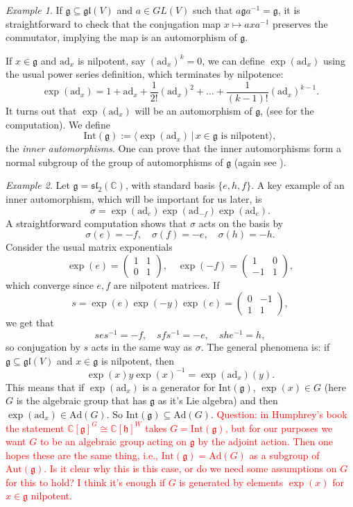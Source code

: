 \documentclass[12pt]{amsart}
\newcommand{\C}{\mathbb{C}}
\newcommand{\g}{\mathfrak{g}}
\newcommand{\h}{\mathfrak{h}}
\newcommand{\ad}{\mathrm{ad}}
\theoremstyle{remark}
\theoremstyle{remark}
\newtheorem*{example}{Example}
\theoremstyle{remark}
\begin{document}
\begin{example}
If $\g \subseteq \mathfrak{gl}(V)$ and $a \in GL(V)$ such that $a \g a^{-1} = \g$, it is straightforward to check that the conjugation map $x \mapsto a x a^{-1}$ preserves the commutator, implying the map is an automorphism of $\g$.
\end{example}

If $x \in \g$ and $\ad_x$ is nilpotent, say $(\ad_x)^k = 0$, we can define $\exp(\ad_x)$ using the usual power series definition, which terminates by nilpotence:
$$\exp(\ad_x) = 1 + \ad_x + \frac{1}{2!} (\ad_x)^2 + \ldots + \frac{1}{(k-1)!} (\ad_x)^{k-1}.$$
It turns out that $\exp(\ad_x)$ will be an automorphism of $\g$, (see \cite[\S 2.3]{Humphreys72} for the computation).
We define 
$$\mathrm{Int}(\g) := \langle \exp(\ad_x) \, | \, x \in \g \text{ is nilpotent}\rangle,$$
the \emph{inner automorphisms}.
One can prove that the inner automorphisms form a normal subgroup of the group of automorphisms of $\g$ (again see \cite[\S 2.3]{Humphreys72}).

\begin{example}
Let $\g = \mathfrak{sl}_2(\C)$, with standard basis $\{e, h, f\}$.
A key example of an inner automorphism, which will be important for us later, is
$$\sigma = \exp(\ad_e)\exp(\ad_{-f})\exp(\ad_e).$$
A straightforward computation shows that $\sigma$ acts on the basis by
$$\sigma(e) = -f, \quad \sigma(f) = -e, \quad \sigma(h) = -h.$$
Consider the usual matrix exponentials 
$$\exp(e) = 
\begin{pmatrix}
	1 & 1 \\
	0 & 1 
\end{pmatrix},
\quad
\exp(-f) =
\begin{pmatrix}
	1 & 0 \\
	-1 & 1
\end{pmatrix},$$
which converge since $e, f$ are nilpotent matrices.
If
$$s = \exp(e) \exp(-y) \exp(e) =
\begin{pmatrix}
	0 & -1 \\
	1 & 1
\end{pmatrix},$$
we get that
$$s e s^{-1} = -f, \quad s f s^{-1} = -e, \quad s h e^{-1}=h,$$
so conjugation by $s$ acts in the same way as $\sigma$.
The general phenomena is:
if $\g \subseteq \mathfrak{gl}(V)$ and $x \in \g$ is nilpotent, then
$$\exp(x) y \exp(x)^{-1} = \exp(\ad_x)(y).$$
This means that if $\exp(\ad_x)$ is a generator for $\mathrm{Int}(\g)$, $\exp(x) \in G$ (here $G$ is the algebraic group that has $\g$ as it's Lie algebra) and then $\exp(\ad_x) \in \mathrm{Ad}(G)$.
So $\mathrm{Int}(\g) \subseteq \mathrm{Ad}(G)$.
\textcolor{red}{Question: in Humphrey's book the statement $\C[\g]^G \cong \C[\h]^W$ takes $G = \mathrm{Int}(\g)$, but for our purposes we want $G$ to be an algebraic group acting on $\g$ by the adjoint action.
Then one hopes these are the same thing, i.e., $\mathrm{Int}(\g) = \mathrm{Ad}(G)$ as a subgroup of $\mathrm{Aut}(\g)$.
Is it clear why this is this case, or do we need some assumptions on $G$ for this to hold? 
I think it's enough if $G$ is generated by elements $\exp(x)$ for $x \in \g$ nilpotent.}
\end{example}
\end{document}
